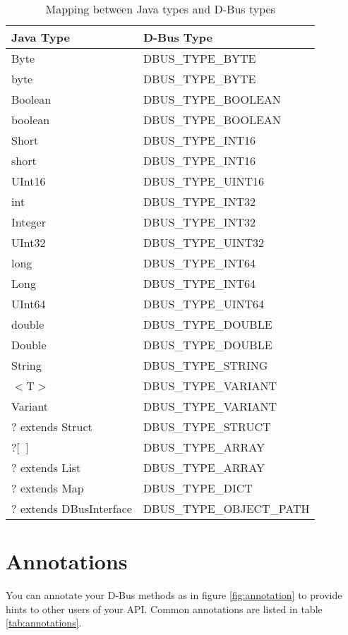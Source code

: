 \documentclass[a4paper,12pt]{article}
\begin{document}
\begin{table}
\begin{center}
\begin{tabular}{l|l}
\bf Java Type & \bf D-Bus Type \\
\hline
Byte	&	DBUS\_TYPE\_BYTE	\\
byte	&	DBUS\_TYPE\_BYTE	\\
Boolean	&	DBUS\_TYPE\_BOOLEAN	\\
boolean	&	DBUS\_TYPE\_BOOLEAN	\\
Short	&	DBUS\_TYPE\_INT16	\\
short	&	DBUS\_TYPE\_INT16	\\
UInt16	&	DBUS\_TYPE\_UINT16	\\
int	&	DBUS\_TYPE\_INT32	\\
Integer	&	DBUS\_TYPE\_INT32	\\
UInt32	&	DBUS\_TYPE\_UINT32	\\
long	&	DBUS\_TYPE\_INT64	\\
Long	&	DBUS\_TYPE\_INT64	\\
UInt64	&	DBUS\_TYPE\_UINT64	\\
double	&	DBUS\_TYPE\_DOUBLE	\\
Double	&	DBUS\_TYPE\_DOUBLE	\\
String	&	DBUS\_TYPE\_STRING	\\
$<$T$>$	&	DBUS\_TYPE\_VARIANT	\\
Variant	&	DBUS\_TYPE\_VARIANT	\\
? extends Struct	&	DBUS\_TYPE\_STRUCT	\\
?$[$~$]$	&	DBUS\_TYPE\_ARRAY	\\
? extends List	&	DBUS\_TYPE\_ARRAY	\\
? extends Map	&	DBUS\_TYPE\_DICT	\\
? extends DBusInterface	&	DBUS\_TYPE\_OBJECT\_PATH	\\
\end{tabular}
\end{center}
\caption{Mapping between Java types and D-Bus types}
\label{table:types}
\end{table}

\section{Annotations}

You can annotate your D-Bus methods as in figure \ref{fig:annotation} to provide hints to other users of your API. Common annotations are listed in table \ref{tab:annotations}.
\end{document}
